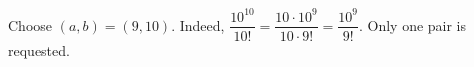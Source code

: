 Choose $\boxed{(a,b)=(9,10)}$. Indeed, $\dfrac{10^{10}}{10!}=\dfrac{10\cdot10^9}{10\cdot9!}=\dfrac{10^9}{9!}$. Only one pair is requested.
